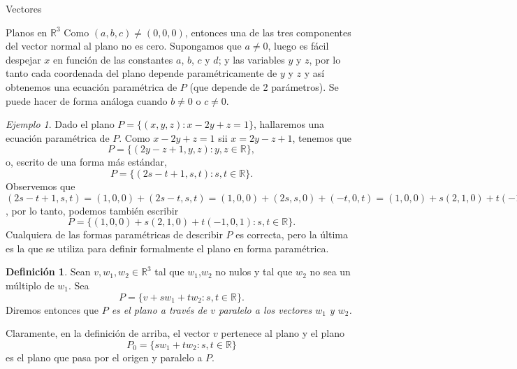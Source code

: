 \documentclass[a4paper,12pt,twoside,spanish,reqno]{amsbook}
\numberwithin{equation}{section}
\theoremstyle{definition}
\newtheorem{definicion}[teorema]{Definici\'on}
\theoremstyle{remark}
\newtheorem*{ejemplo*}{Ejemplo}
\newcommand{\R}{\mathbb R}
\begin{document}
\begin{chapter}{Vectores}
\begin{section}{Planos en $\R^3$}
        Como $(a,b,c) \ne (0,0,0)$,  entonces una de las tres componentes del vector normal al plano no es cero. Supongamos que $a\ne 0$,  luego es fácil despejar $x$ en función de las constantes $a$, $b$, $c$ y $d$; y las variables $y$ y $z$, por lo tanto cada coordenada del plano depende paramétricamente de $y$ y $z$ y así obtenemos una ecuación paramétrica de $P$ (que depende de 2 parámetros). Se puede hacer de forma análoga cuando $b\ne 0$ o $c \ne 0$. 
        
        \begin{ejemplo*}
            Dado el plano $P = \{(x,y,z): x -2y +z =1\}$,  hallaremos una ecuación paramétrica de $P$. Como  $x -2y +z =1$ sii  $x = 2y-z +1$, tenemos que
            \begin{equation*}
                P = \{(2y-z +1,y,z): y,z \in \R\},
            \end{equation*}
            o,  escrito de una forma más estándar,
            \begin{equation*}
            P = \{(2s-t +1,s,t): s,t \in \R\}. 
            \end{equation*}
            Observemos que $(2s-t +1,s,t) = (1,0,0) + (2s-t,s,t)= (1,0,0) + (2s,s,0) + (-t,0,t) = (1,0,0) + s(2,1,0) + t(-1,0,1) $, por lo tanto, podemos también escribir
            \begin{equation*}
            P = \{(1,0,0) + s(2,1,0) + t(-1,0,1): s,t \in \R\}. 
            \end{equation*}
            Cualquiera de las formas paramétricas de describir $P$  es correcta, pero la última es la que se utiliza para definir formalmente el plano en forma paramétrica. 
            
        \end{ejemplo*}
    
    \begin{definicion}
        Sean $v, w_1,w_2 \in \R^3$ tal que  $w_1$,$w_2$ no  nulos y tal que $w_2$ no sea un múltiplo de $w_1$. Sea 
        \begin{equation*}
        P = \{v + sw_1 + tw_2: s,t \in \R\}. 
        \end{equation*}
        Diremos entonces que  \textit{$P$ es el  plano a través de $v$ paralelo a los vectores $w_1$ y $w_2$.}\index{plano en $\R^3$!ecuación paramétrica} 
    \end{definicion}
    
        Claramente,  en la definición de arriba, el vector $v$ pertenece al plano y el plano 
        \begin{equation*}
        P_0 = \{sw_1 + tw_2: s,t \in \R\}
        \end{equation*}
        es el plano que pasa por el origen y paralelo a $P$. 
 

\end{section}
\end{chapter}
\end{document}
